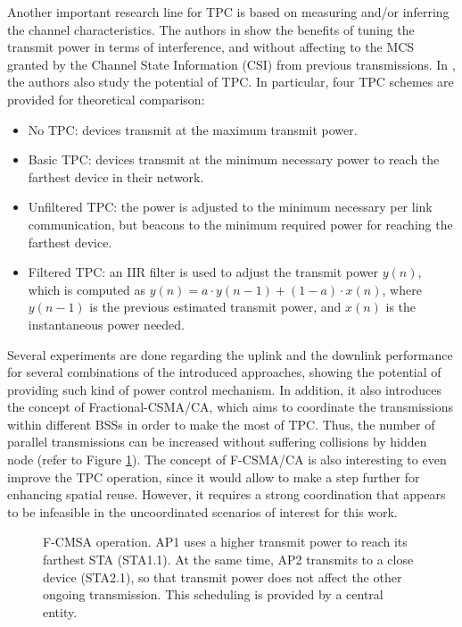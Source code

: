 \documentclass[12pt, a4paper,twoside]{tesi_upf}
\begin{document}
				Another important research line for TPC is based on measuring and/or inferring the channel characteristics. The authors in \cite{chaves2014adaptive} show the benefits of tuning the transmit power in terms of interference, and without affecting to the MCS granted by the Channel State Information (CSI) from previous transmissions. In \cite{oteri2013advanced}, the authors also study the potential of TPC. In particular, four TPC schemes are provided for theoretical comparison:
				\begin{itemize}
					\item No TPC: devices transmit at the maximum transmit power.
					\item Basic TPC: devices transmit at the minimum necessary power to reach the farthest device in their network.
					\item Unfiltered TPC: the power is adjusted to the minimum necessary per link communication, but beacons to the minimum required power for reaching the farthest device.
					\item Filtered TPC: an IIR filter is used to adjust the transmit power $y(n)$, which is computed as $y(n) = a \cdot y(n-1) + (1-a) \cdot x(n)$, where  $y(n-1)$ is the previous estimated transmit power, and $x(n)$ is the instantaneous power needed.
				\end{itemize}  
				Several experiments are done regarding the uplink and the downlink performance for several combinations of the introduced approaches, showing the potential of providing such kind of power control mechanism. In addition, it also introduces the concept of Fractional-CSMA/CA, which aims to coordinate the transmissions within different BSSs in order to make the most of TPC. Thus, the number of parallel transmissions can be increased without suffering collisions by hidden node (refer to Figure \ref{fig:fcsma}). The concept of F-CSMA/CA is also interesting to even improve the TPC operation, since it would allow to make a step further for enhancing spatial reuse. However, it requires a strong coordination that appears to be infeasible in the uncoordinated scenarios of interest for this work.
				\begin{figure}[t!]
					\centering
					\caption{F-CMSA operation. AP1 uses a higher transmit power to reach its farthest STA (STA1.1). At the same time, AP2 transmits to a close device (STA2.1), so that transmit power does not affect the other ongoing transmission. This scheduling is provided by a central entity.}
					\label{fig:fcsma}
				\end{figure}	
			
\end{document}
